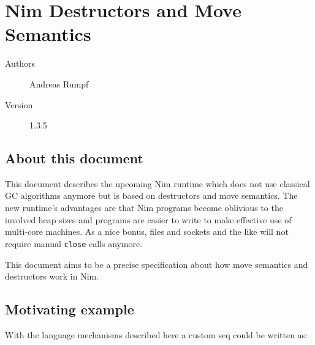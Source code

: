 \hypertarget{nim-destructors-and-move-semantics}{%
\section{Nim Destructors and Move
Semantics}\label{nim-destructors-and-move-semantics}}

\begin{description}
\item[Authors]
Andreas Rumpf
\item[Version]
1.3.5
\end{description}

\hypertarget{about-this-document}{%
\subsection{About this document}\label{about-this-document}}

This document describes the upcoming Nim runtime which does not use
classical GC algorithms anymore but is based on destructors and move
semantics. The new runtime's advantages are that Nim programs become
oblivious to the involved heap sizes and programs are easier to write to
make effective use of multi-core machines. As a nice bonus, files and
sockets and the like will not require manual \texttt{close} calls
anymore.

This document aims to be a precise specification about how move
semantics and destructors work in Nim.

\hypertarget{motivating-example}{%
\subsection{Motivating example}\label{motivating-example}}

With the language mechanisms described here a custom seq could be
written as:


